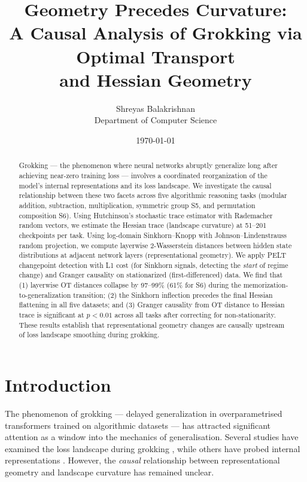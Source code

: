 \documentclass[12pt,twoside]{article}
\title{
  \vspace{-2em}
  Geometry Precedes Curvature: \\
  A Causal Analysis of Grokking via Optimal Transport \\ and Hessian Geometry
  \vspace{-1em}
}
\author{
  Shreyas Balakrishnan \\
  \small Department of Computer Science
}
\date{\today}
\begin{document}
\maketitle

\begin{abstract}
  Grokking --- the phenomenon where neural networks abruptly generalize long
  after achieving near-zero training loss --- involves a coordinated
  reorganization of the model's internal representations and its loss landscape.
  We investigate the causal relationship between these two facets across five
  algorithmic reasoning tasks (modular addition, subtraction, multiplication,
  symmetric group S5, and permutation composition S6). Using Hutchinson's
  stochastic trace estimator with Rademacher random vectors, we estimate the
  Hessian trace (landscape curvature) at 51--201 checkpoints per task. Using
  log-domain Sinkhorn--Knopp with Johnson--Lindenstrauss random projection, we
  compute layerwise 2-Wasserstein distances between hidden state distributions
  at adjacent network layers (representational geometry). We apply PELT
  changepoint detection with L1 cost (for Sinkhorn signals, detecting the
  \emph{start} of regime change) and Granger causality on stationarized
  (first-differenced) data. We find that (1) layerwise OT distances collapse by
  97--99\% (61\% for S6) during the memorization-to-generalization transition;
  (2) the Sinkhorn inflection precedes the final Hessian flattening in all five
  datasets; and (3) Granger causality from OT distance to Hessian trace is
  significant at $p<0.01$ across all tasks after correcting for
  non-stationarity. These results establish that representational geometry
  changes are causally upstream of loss landscape smoothing during grokking.
\end{abstract}

\section{Introduction}
\label{sec:introduction}

The phenomenon of grokking \citep{power2022grokking} --- delayed generalization
in overparametrised transformers trained on algorithmic datasets --- has
attracted significant attention as a window into the mechanics of
generalisation. Several studies have examined the loss landscape during
grokking \citep{liu2022loss, thilak2022slingshot}, while others have probed
internal representations \citep{nanda2022progress, chughtai2023summing}.
However, the \emph{causal} relationship between representational geometry and
landscape curvature has remained unclear.
\end{document}
